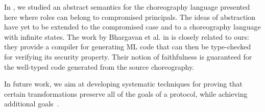 \documentclass[copyright]{eptcs}
\begin{document}
In \cite{CG09b}, we studied an abstract semantics for the choreography
language presented here where roles can belong to compromised
principals. The ideas of abstraction have yet to be extended to the
compromised case and to a choreography language with infinite
states. The work by Bhargavan et al. in \cite{BhargavanEtAl09, CDFBL08} is
closely related to ours: they provide a compiler for generating ML
code that can then be type-checked for verifying its security
property. Their notion of faithfulness is guaranteed for the
well-typed code generated from the source choreography.

In future work, we aim at developing systematic techniques for proving
that certain transformations preserve all of the goals of a protocol,
while achieving additional goals~\cite{Guttman09a}.







\label{sect:bib}


\end{document}
